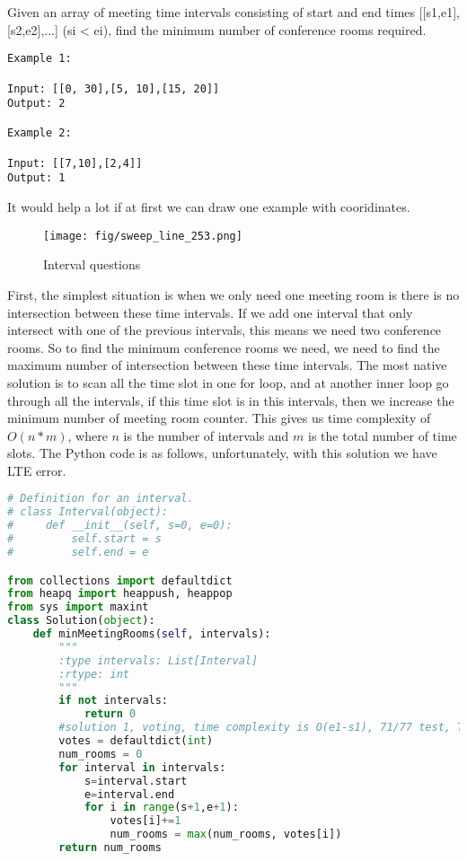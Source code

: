 \documentclass[../main.tex]{subfiles}
\begin{document}
Given an array of meeting time intervals consisting of start and end times [[s1,e1],[s2,e2],...] (si < ei), find the minimum number of conference rooms required.
\begin{lstlisting}
Example 1:

Input: [[0, 30],[5, 10],[15, 20]]
Output: 2

Example 2:

Input: [[7,10],[2,4]]
Output: 1
\end{lstlisting}
It would help a lot if at first we can draw one example with cooridinates.
\begin{figure}[h]
    \centering
    \texttt{[image: fig/sweep\_line\_253.png]}
    \caption{Interval questions}
    \label{fig:interval}
\end{figure}
First, the simplest situation is when we only need one meeting room is there is no intersection between these time intervals. If we add one interval that only intersect with one of the previous intervals, this means we need two conference rooms. So to find the minimum conference rooms we need, we need to find the maximum number of intersection between these time intervals. The most native solution is to scan all the time slot in one for loop, and at another inner loop go through all the intervals, if this time slot is in this intervals, then we increase the minimum number of meeting room counter. This gives us time complexity of $O(n*m)$, where $n$ is the number of intervals and $m$ is the total number of time slots. The Python code is as follows, unfortunately, with this solution we have LTE error.  
\begin{lstlisting}[language = Python]
# Definition for an interval.
# class Interval(object):
#     def __init__(self, s=0, e=0):
#         self.start = s
#         self.end = e

from collections import defaultdict
from heapq import heappush, heappop
from sys import maxint
class Solution(object):
    def minMeetingRooms(self, intervals):
        """
        :type intervals: List[Interval]
        :rtype: int
        """
        if not intervals:
            return 0
        #solution 1, voting, time complexity is O(e1-s1), 71/77 test, TLE
        votes = defaultdict(int)
        num_rooms = 0   
        for interval in intervals:
            s=interval.start
            e=interval.end
            for i in range(s+1,e+1):
                votes[i]+=1
                num_rooms = max(num_rooms, votes[i])
        return num_rooms
\end{lstlisting}
\end{document}

